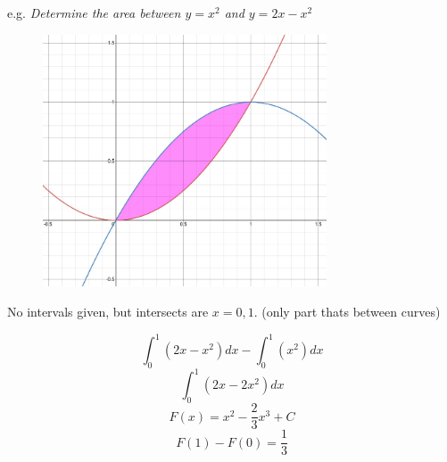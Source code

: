 \documentclass[a4paper,12pt]{article}
\begin{document}
e.g. \emph{Determine the area between $y = x^2$ and $y = 2x - x^2$}
\begin{figure}[H]
    \centering
    \includegraphics[width=0.75\textwidth]{between2}
\end{figure}
No intervals given, but intersects are $x = 0, 1$. (only part thats between curves)

$$\int^1_0{(2x - x^2)}dx - \int^1_0{(x^2)}dx$$
$$\int^1_0{(2x - 2x^2)}dx$$
$$F(x) = x^2 - \frac{2}{3}x^3 + C$$
$$F(1) - F(0) = \frac{1}{3}$$
\end{document}
